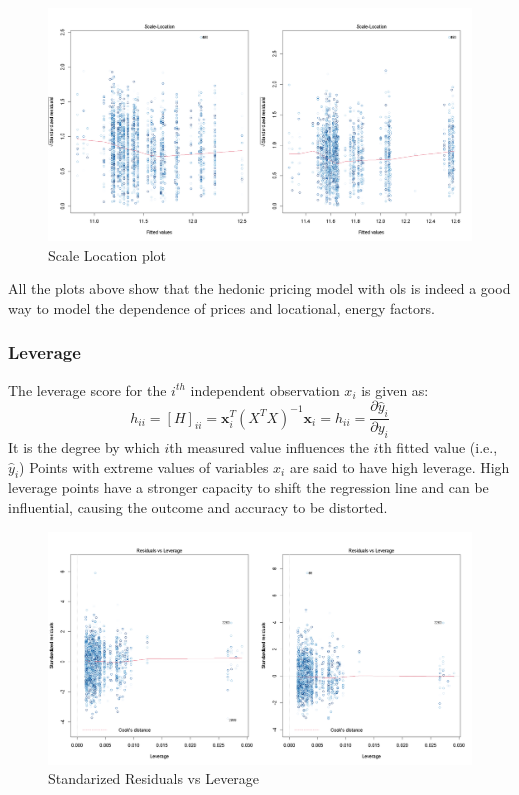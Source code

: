 \documentclass[12pt]{article}
\begin{document}

\begin{figure}[H]
    \centering
    \includegraphics[width=18cm]{3.3 images/3.3.3plot.png}
    \caption{Scale Location plot}
    \label{fig:scale}
\end{figure}

All the plots above show that the hedonic pricing model with \acrshort{ols} is indeed a good way to model the dependence of prices and locational, energy factors.

\subsubsection{Leverage}
The leverage score for the $i^{th}$ independent observation $x_i$ is given as:
$$h_{ii}=[H]_{ii}=\textbf{x}_i^T(X^TX)^{-1}\textbf{x}_i=h_{ii}=\frac{\partial \hat y_i}{\partial y_i}$$
It is the degree by which $i$th measured value influences the $i$th fitted value (i.e., $\hat y_i$)
Points with extreme values of variables $x_i$ are said to have high leverage. High leverage points have a stronger capacity to shift the regression line and can be influential, causing the outcome and accuracy to be distorted.

\begin{figure}[H]
    \centering
    \includegraphics[width=18cm]{3.3 images/3.3.4.png}
    \caption{Standarized Residuals vs Leverage}
    \label{fig:lev}
\end{figure}
\end{document}

